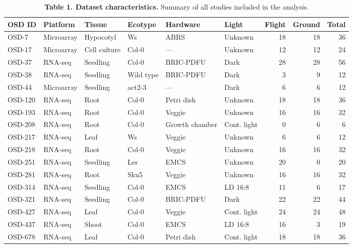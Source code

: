 \documentclass[11pt,a4paper]{article}
\begin{document}
\begin{table}[htbp]
\centering
\caption{\textbf{Table 1. Dataset characteristics.} Summary of all studies included in the analysis.}
\small
\begin{tabularx}{\textwidth}{lXllllrrr}
\toprule
\textbf{OSD ID} & \textbf{Platform} & \textbf{Tissue} & \textbf{Ecotype} & \textbf{Hardware} & \textbf{Light} & \textbf{Flight} & \textbf{Ground} & \textbf{Total} \\
\midrule
OSD-7 & Microarray & Hypocotyl & Ws & ABRS & Unknown & 18 & 18 & 36 \\
OSD-17 & Microarray & Cell culture & Col-0 & --- & Unknown & 12 & 12 & 24 \\
OSD-37 & RNA-seq & Seedling & Col-0 & BRIC-PDFU & Dark & 28 & 28 & 56 \\
OSD-38 & RNA-seq & Seedling & Wild type & BRIC-PDFU & Dark & 3 & 9 & 12 \\
OSD-44 & Microarray & Seedling & act2-3 & --- & Dark & 6 & 6 & 12 \\
OSD-120 & RNA-seq & Root & Col-0 & Petri dish & Unknown & 18 & 18 & 36 \\
OSD-193 & RNA-seq & Root & Col-0 & Veggie & Unknown & 16 & 16 & 32 \\
OSD-208 & RNA-seq & Root & Col-0 & Growth chamber & Cont. light & 0 & 6 & 6 \\
OSD-217 & RNA-seq & Leaf & Ws & Veggie & Unknown & 6 & 6 & 12 \\
OSD-218 & RNA-seq & Root & Col-0 & Veggie & Unknown & 16 & 16 & 32 \\
OSD-251 & RNA-seq & Seedling & Ler & EMCS & Unknown & 20 & 0 & 20 \\
OSD-281 & RNA-seq & Root & Sku5 & Veggie & Unknown & 16 & 16 & 32 \\
OSD-314 & RNA-seq & Seedling & Col-0 & EMCS & LD 16:8 & 11 & 6 & 17 \\
OSD-321 & RNA-seq & Seedling & Col-0 & BRIC-PDFU & Dark & 22 & 22 & 44 \\
OSD-427 & RNA-seq & Leaf & Col-0 & Veggie & Cont. light & 24 & 24 & 48 \\
OSD-437 & RNA-seq & Shoot & Col-0 & EMCS & LD 16:8 & 16 & 3 & 19 \\
OSD-678 & RNA-seq & Leaf & Col-0 & Petri dish & Cont. light & 18 & 18 & 36 \\
\bottomrule
\end{tabularx}
\end{table}
\end{document}
